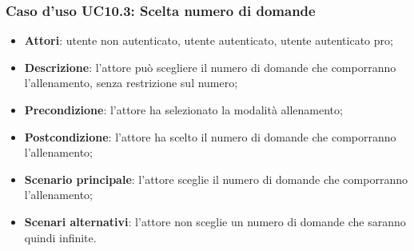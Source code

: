 \subsubsection{Caso d'uso UC10.3: Scelta numero di domande}
	\begin{itemize}
		\item \textbf{Attori}: utente non autenticato, utente autenticato, utente autenticato pro;
		\item \textbf{Descrizione}: l'attore può scegliere il numero di domande che comporranno l'allenamento, senza restrizione sul numero;
		\item \textbf{Precondizione}: l'attore ha selezionato la modalità allenamento;
		\item \textbf{Postcondizione}: l'attore ha scelto il numero di domande che comporranno l'allenamento;
		\item \textbf{Scenario principale}: l'attore sceglie il numero di domande che comporranno l'allenamento;
		\item \textbf{Scenari alternativi}: l'attore non sceglie un numero di domande che saranno quindi infinite.
	\end{itemize}
	
